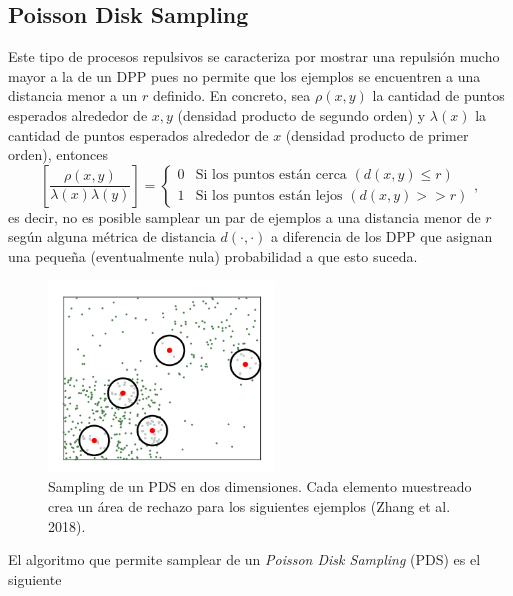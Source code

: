 \subsection{Poisson Disk Sampling}


Este tipo de procesos repulsivos se caracteriza por mostrar una repulsión mucho mayor a la de un DPP pues no permite que los ejemplos se encuentren a una distancia menor a un $r$ definido. En concreto, sea $\rho(x,y)$ la cantidad de puntos esperados alrededor de $x,y$ (densidad producto de segundo orden) y $\lambda(x)$ la cantidad de puntos esperados alrededor de $x$ (densidad producto de primer orden), entonces 
\[
\left [ \frac{\rho(x,y)}{\lambda(x)\lambda(y)}\right ] = \left\{\begin{matrix}
0 & \text{Si los puntos están cerca }(d(x,y) \leq r) \\ 
1 & \text{Si los puntos están lejos } (d(x,y)>>r)
\end{matrix}\right. , 
\]
es decir, no es posible samplear un par de ejemplos a una distancia menor de $r$ según alguna métrica de distancia $d(\cdot, \cdot)$ a diferencia de los DPP que asignan una pequeña (eventualmente nula) probabilidad a que esto suceda. 


\begin{figure}[ht]
    \centering
    \includegraphics[width=6cm]{img/tesis/PDS.png}
    \caption{Sampling de un PDS en dos dimensiones. Cada elemento muestreado crea un área de rechazo para los siguientes ejemplos (Zhang et al. 2018).}
    \label{fig:PDS}
\end{figure}

\vspace{0.2cm}

El algoritmo que permite samplear de un \textit{Poisson Disk Sampling} (PDS) es el siguiente 

